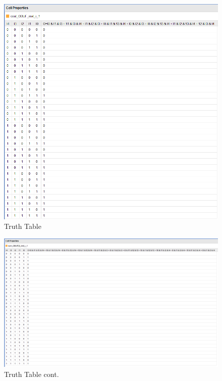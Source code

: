 \documentclass{article}
\begin{document}
\begin{figure}[h]
\begin{center}
\includegraphics[width=1\textwidth]{fourBitAdderTruth.png} %
\caption{Truth Table}
\end{center}
\end{figure}


\begin{figure}[h]
\begin{center}
\includegraphics[width=1\textwidth]{fourBitAdderTruth1.png} %
\caption{Truth Table cont.}
\end{center}
\end{figure}
\end{document}
